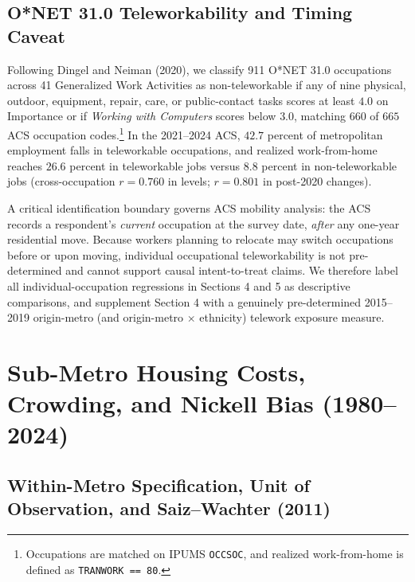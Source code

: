 \documentclass[11pt]{article}
\begin{document}
\subsection{O*NET 31.0 Teleworkability and Timing Caveat}

Following Dingel and Neiman (2020), we classify 911 O*NET 31.0 occupations across 41 Generalized Work Activities as non-teleworkable if any of nine physical, outdoor, equipment, repair, care, or public-contact tasks scores at least $4.0$ on Importance or if \emph{Working with Computers} scores below $3.0$, matching $660$ of $665$ ACS occupation codes.\footnote{Occupations are matched on IPUMS \texttt{OCCSOC}, and realized work-from-home is defined as \texttt{TRANWORK == 80}.} In the 2021--2024 ACS, $42.7$ percent of metropolitan employment falls in teleworkable occupations, and realized work-from-home reaches $26.6$ percent in teleworkable jobs versus $8.8$ percent in non-teleworkable jobs (cross-occupation $r = 0.760$ in levels; $r = 0.801$ in post-2020 changes).

A critical identification boundary governs ACS mobility analysis: the ACS records a respondent's \emph{current} occupation at the survey date, \emph{after} any one-year residential move. Because workers planning to relocate may switch occupations before or upon moving, individual occupational teleworkability is not pre-determined and cannot support causal intent-to-treat claims. We therefore label all individual-occupation regressions in Sections 4 and 5 as descriptive comparisons, and supplement Section 4 with a genuinely pre-determined 2015--2019 origin-metro (and origin-metro $\times$ ethnicity) telework exposure measure.

\section{Sub-Metro Housing Costs, Crowding, and Nickell Bias (1980--2024)}

\subsection{Within-Metro Specification, Unit of Observation, and Saiz--Wachter (2011)}
\end{document}
